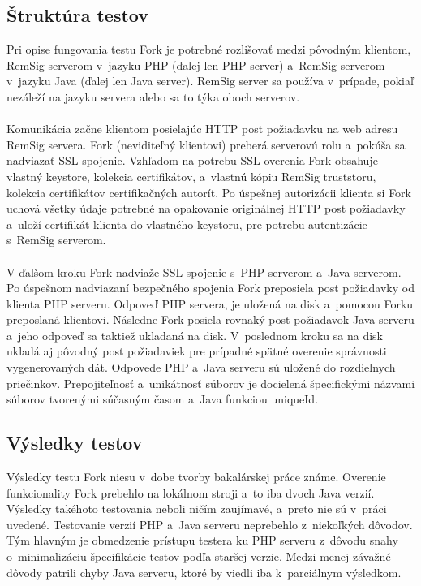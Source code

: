 \documentclass[
  digital, %
  table,   %
oneside,
  nolof,     %
  nolot,     %
]{fithesis3}
\begin{document}
\subsection{Štruktúra testov}
Pri opise fungovania testu Fork je potrebné rozlišovať medzi pôvodným klientom, RemSig serverom v~jazyku PHP (ďalej len PHP server) a~RemSig serverom v~jazyku Java (ďalej len Java server). RemSig server sa používa v~prípade, pokiaľ nezáleží na jazyku servera alebo sa to týka oboch serverov. \paragraph{} 
Komunikácia začne klientom posielajúc HTTP post požiadavku na web adresu RemSig servera. Fork (neviditeľný klientovi) preberá serverovú rolu a~pokúša sa nadviazať SSL spojenie. Vzhľadom na potrebu SSL overenia Fork  obsahuje vlastný keystore, kolekcia certifikátov, a~vlastnú kópiu RemSig truststoru, kolekcia certifikátov certifikačných autorít. Po úspešnej autorizácii klienta si Fork uchová všetky údaje potrebné na opakovanie originálnej HTTP post požiadavky a~uloží certifikát klienta do vlastného keystoru, pre potrebu autentizácie s~RemSig serverom. \paragraph{}
V ďalšom kroku Fork nadviaže SSL spojenie s~PHP serverom a~Java serverom. Po úspešnom nadviazaní bezpečného spojenia Fork preposiela post požiadavky od klienta PHP serveru. Odpoveď PHP servera, je uložená na disk a~pomocou Forku preposlaná klientovi. Následne Fork posiela rovnaký post požiadavok Java serveru a~jeho odpoveď sa taktiež ukladaná na disk. V~poslednom kroku sa na disk ukladá aj pôvodný post požiadaviek pre prípadné spätné overenie správnosti vygenerovaných dát.
Odpovede PHP a~Java serveru sú uložené do rozdielnych priečinkov. Prepojiteľnosť a~unikátnosť  súborov je docielená špecifickými názvami súborov tvorenými súčasným časom a~Java funkciou  uniqueId. 
\subsection{Výsledky testov}
Výsledky testu Fork niesu v~dobe tvorby bakalárskej práce známe. Overenie funkcionality Fork prebehlo na lokálnom stroji a~to iba dvoch Java verzií. Výsledky takéhoto testovania neboli ničím zaujímavé, a~preto nie sú v~práci uvedené. Testovanie verzií PHP a~Java serveru neprebehlo z~niekoľkých dôvodov. Tým hlavným je obmedzenie prístupu testera ku PHP serveru z~dôvodu snahy o~minimalizáciu špecifikácie testov podľa staršej verzie. Medzi menej závažné dôvody patrili chyby Java serveru, ktoré by viedli iba k~parciálnym výsledkom.
\end{document}
